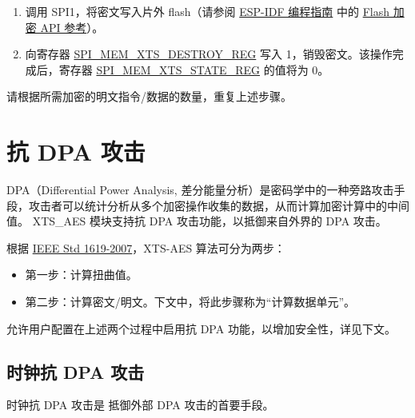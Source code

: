 \documentclass[main\_\_CN.tex]{subfiles}
\begin{document}
\begin{enumerate}
    \item 调用 SPI1，将密文写入片外 flash（请参阅 \href{https://docs.espressif.com/projects/esp-idf/en/latest/esp32h2/index.html}{ESP-IDF 编程指南} 中的 \href{https://docs.espressif.com/projects/esp-idf/en/latest/esp32c6/api-reference/peripherals/spi_flash/index.html#api-reference-flash-encrypt}{Flash 加密 API 参考}）。

    \item 向寄存器 \hyperref[regdesc:SPIMEMXTSDESTROYREG]{SPI\_MEM\_XTS\_DESTROY\_REG} 写入 1，销毁密文。该操作完成后，寄存器 \hyperref[regdesc:SPIMEMXTSSTATEREG]{SPI\_MEM\_XTS\_STATE\_REG} 的值将为 0。

\end{enumerate}

请根据所需加密的明文指令/数据的数量，重复上述步骤。


\section{抗 DPA 攻击}
DPA（Differential Power Analysis, 差分能量分析）是密码学中的一种旁路攻击手段，攻击者可以统计分析从多个加密操作收集的数据，从而计算加密计算中的中间值。\chipname{} XTS\_AES 模块支持抗 DPA 攻击功能，以抵御来自外界的 DPA 攻击。

根据 \href{https://ieeexplore.ieee.org/document/4493450}{IEEE Std 1619-2007}，XTS-AES 算法可分为两步：
\begin{itemize}
    \item 第一步：计算扭曲值。
    \item 第二步：计算密文/明文。下文中，将此步骤称为“计算数据单元”。
\end{itemize}

\chipname{} 允许用户配置在上述两个过程中启用抗 DPA 功能，以增加安全性，详见下文。

\subsection{时钟抗 DPA 攻击}
时钟抗 DPA 攻击是 \chipname{} 抵御外部 DPA 攻击的首要手段。
\end{document}
